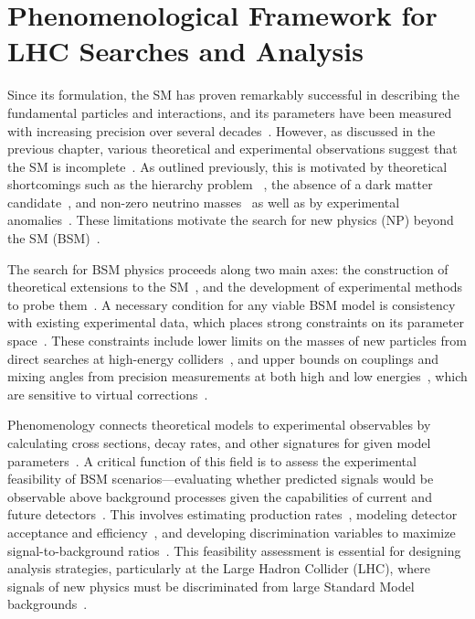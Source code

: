 \chapter[Phenomenological Framework]{Phenomenological Framework for LHC Searches and Analysis}\label{ch:pheno}

Since its formulation, the SM has proven remarkably successful in describing the fundamental particles and interactions, and its parameters have been measured with increasing precision over several decades~\cite{1674-1137-40-10-100001,PhysRevLett.19.1264}. However, as discussed in the previous chapter, various theoretical and experimental observations suggest that the SM is incomplete~\cite{Nilles1984,Dorsner:2016wpm}. As outlined previously, this is motivated by theoretical shortcomings such as the hierarchy problem~\cite{Randall:1999ee,Giudice2013_review} , the absence of a dark matter candidate~\cite{Bertone2005_DM_review}, and non-zero neutrino masses~\cite{Mohapatra:1985xm} as well as by experimental anomalies~\cite{LHCb:2014vgu,LHCb:2017avl,BaBar:2012obs}. These limitations motivate the search for new physics (NP) beyond the SM (BSM)~\cite{Dorsner:2016wpm,Buttazzo:2017ixm}.

The search for BSM physics proceeds along two main axes: the construction of theoretical extensions to the SM~\cite{Dorsner:2016wpm,Buttazzo:2017ixm,Giudice2013_review}, and the development of experimental methods to probe them~\cite{Alwall:2014hca,Alloul:2013bka,deFavereau:2013fsa}. A necessary condition for any viable BSM model is consistency with existing experimental data, which places strong constraints on its parameter space~\cite{1674-1137-40-10-100001,ATLAS:2019erb,CMS:2021ctt}. These constraints include lower limits on the masses of new particles from direct searches at high-energy colliders~\cite{ATLAS:2019erb,CMS:2021ctt}, and upper bounds on couplings and mixing angles from precision measurements at both high and low energies~\cite{Schael_2006,Altmannshofer_2015}, which are sensitive to virtual corrections~\cite{Ciuchini:2022wbq}.


Phenomenology connects theoretical models to experimental observables by calculating cross sections, decay rates, and other signatures for given model parameters~\cite{Alwall:2014hca,Sjostrand:2014zea,Cacciari:2011ma}. A critical function of this field is to assess the experimental feasibility of BSM scenarios—evaluating whether predicted signals would be observable above background processes given the capabilities of current and future detectors~\cite{deFavereau:2013fsa,Alwall:2014hca,Alloul:2013bka}. This involves estimating production rates~\cite{Alwall:2014hca,Sjostrand:2014zea,NNPDF:2014otw}, modeling detector acceptance and efficiency~\cite{deFavereau:2013fsa,ATLAS:2008xda,CMS:2008xjf,lumiRef}, and developing discrimination variables to maximize signal-to-background ratios~\cite{pedregosa_scikit-learn_2011,Chen2016,Bols_2020,CMS_DeepTau}. This feasibility assessment is essential for designing analysis strategies, particularly at the Large Hadron Collider (LHC), where signals of new physics must be discriminated from large Standard Model backgrounds~\cite{deFavereau:2013fsa,Alwall:2014hca}.

